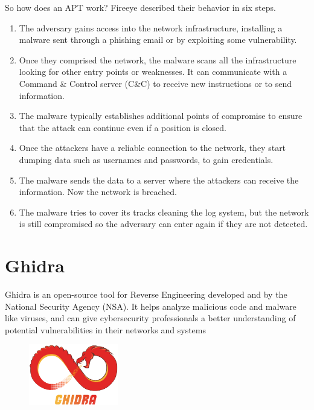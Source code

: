 So how does an APT work? Fireeye described their behavior in six steps. \cite{fireeye_anatomy}


\begin{enumerate}
	\item The adversary gains access into the network infrastructure, installing a malware sent through a phishing email or by exploiting some vulnerability.
	\item Once they comprised the network, the malware scans all the infrastructure looking for other entry points or weaknesses. It can communicate with a Command \& Control server (C\&C) to receive new instructions or to send information.
	\item The malware typically establishes additional points of compromise to ensure that the attack can continue even if a position is closed.
	\item Once the attackers have a reliable connection to the network, they start dumping data such as usernames and passwords, to gain credentials.
	
	\item The malware sends the data to a server where the attackers can receive the information. Now the network is breached.
	
	\item The malware tries to cover its tracks cleaning the log system, but the network is still compromised so the adversary can enter again if they are not detected.
	
\end{enumerate}


\section{Ghidra}
Ghidra is an open-source tool for Reverse Engineering developed and by the National Security Agency (NSA). It helps analyze malicious code and malware like viruses, and can give cybersecurity professionals a better understanding of potential vulnerabilities in their networks and systems \cite{ghidra}
\begin{figure}
	\centering
	\includegraphics[width=0.35\textwidth]{ghidra}
	
\end{figure}


